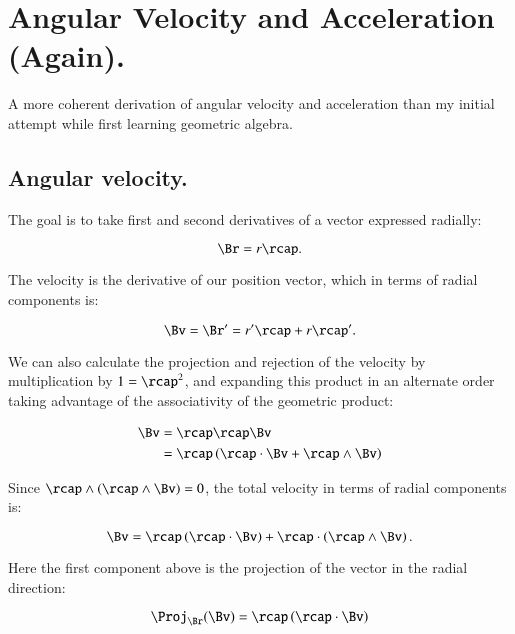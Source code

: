 \chapter{Angular Velocity and Acceleration (Again).}\label{chap:PJAngAcc}
\date{June 10, 2008.  $RCSfile: angularAcc.tex,v $ Last $Revision: 1.9 $ $Date: 2009/06/11 16:45:58 $ }

A more coherent derivation of angular velocity and acceleration than
my initial attempt while first learning geometric algebra.

\section{Angular velocity. }

The goal is to take first and second derivatives of a vector expressed radially:

\begin{equation}
\Br = r \rcap.
\end{equation}

The velocity is the derivative of our position vector, which in terms of radial components is:

\begin{equation}\label{eqn:angular_acc:velocityasrcapprime}
\Bv = \Br' = r' \rcap + r \rcap'.
\end{equation}

We can also calculate the projection and rejection of the velocity by multiplication by $1 = \rcap^2$, and expanding
this product in an alternate order taking advantage of the associativity of the geometric product:

\begin{align*}
\Bv &= \rcap \rcap \Bv \\
    &= \rcap \left ( \rcap \cdot \Bv + \rcap \wedge \Bv \right) \\
\end{align*}

Since $\rcap \wedge (\rcap \wedge \Bv) = 0$, the total velocity in terms of radial components is:

\begin{equation}\label{eqn:angular_acc:velocityprojrej}
\Bv = \rcap \left(\rcap \cdot \Bv\right) + \rcap \cdot \left(\rcap \wedge \Bv\right).
\end{equation}

Here the first component above is the projection of the vector in the radial direction:

\[
\Proj_{\Br}(\Bv) = \rcap \left(\rcap \cdot \Bv\right)
\]

